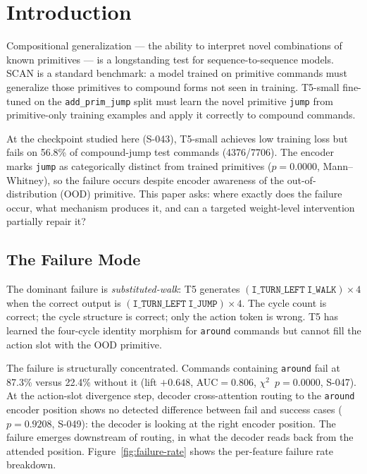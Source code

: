 \section{Introduction}
\label{sec:intro}

Compositional generalization --- the ability to interpret novel combinations of known
primitives --- is a longstanding test for sequence-to-sequence models.
SCAN \citep{lake2018scan} is a standard benchmark: a model trained on primitive commands
must generalize those primitives to compound forms not seen in training.
T5-small \citep{raffel2020t5} fine-tuned on the \texttt{add\_prim\_jump} split must
learn the novel primitive \texttt{jump} from primitive-only training examples and apply
it correctly to compound commands.

At the checkpoint studied here (S-043), T5-small achieves low training loss but fails
on 56.8\% of compound-jump test commands (4376/7706).
The encoder marks \texttt{jump} as categorically distinct from trained primitives
($p=0.0000$, Mann--Whitney), so the failure occurs despite encoder awareness of the
out-of-distribution (OOD) primitive.
This paper asks: where exactly does the failure occur, what mechanism produces it, and
can a targeted weight-level intervention partially repair it?

\subsection{The Failure Mode}

The dominant failure is \emph{substituted-walk}: T5 generates
$(\texttt{I\_TURN\_LEFT}\ \texttt{I\_WALK}){\times}4$ when the correct output is
$(\texttt{I\_TURN\_LEFT}\ \texttt{I\_JUMP}){\times}4$.
The cycle count is correct; the cycle structure is correct; only the action token is wrong.
T5 has learned the four-cycle identity morphism for \texttt{around} commands but cannot
fill the action slot with the OOD primitive.

The failure is structurally concentrated.
Commands containing \texttt{around} fail at 87.3\% versus 22.4\% without it
(lift $+0.648$, AUC$=0.806$, $\chi^2$~$p=0.0000$, S-047).
At the action-slot divergence step, decoder cross-attention routing to the \texttt{around}
encoder position shows no detected difference between fail and success cases
($p=0.9208$, S-049): the decoder is looking at the right encoder position.
The failure emerges downstream of routing, in what the decoder reads back from the
attended position.
Figure~\ref{fig:failure-rate} shows the per-feature failure rate breakdown.

